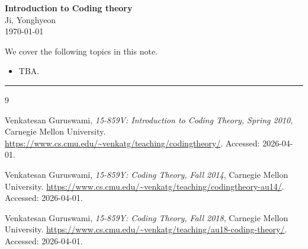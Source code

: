 \documentclass[11pt,openany]{article}
\begin{document}
\begin{center}
\huge\textbf{Introduction to Coding theory
}\\
\vspace{0.5em}
\large{Ji, Yonghyeon}\\
\vspace{0.5em}
\normalsize{\today}\\
\end{center}

\noindent 
We cover the following topics in this note.
\begin{itemize}
\item TBA.
\end{itemize}
\hrule\vspace{12pt}



\newpage

\vfill
\begin{thebibliography}{9}
	
	Venkatesan Guruswami,
	\emph{15-859V: Introduction to Coding Theory, Spring 2010},
	Carnegie Mellon University.
	\url{https://www.cs.cmu.edu/~venkatg/teaching/codingtheory/}.
	Accessed: 2026-04-01.
	
	Venkatesan Guruswami,
	\emph{15-859Y: Coding Theory, Fall 2014},
	Carnegie Mellon University.
	\url{https://www.cs.cmu.edu/~venkatg/teaching/codingtheory-au14/}.
	Accessed: 2026-04-01.
	
	Venkatesan Guruswami,
	\emph{15-859Y: Coding Theory, Fall 2018},
	Carnegie Mellon University.
	\url{https://www.cs.cmu.edu/~venkatg/teaching/au18-coding-theory/}.
	Accessed: 2026-04-01.
	
\end{thebibliography}
\end{document}
